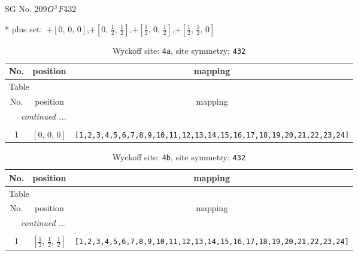 \documentclass[fleqn,8pt]{jsarticle}
\begin{document}
\setcounter{MaxMatrixCols}{32}

\renewcommand{\tablename}{Table~}
\renewcommand{\figurename}{Figure~}
\begin{center}
\LARGE
SG No. 209\quad$O_{\rm }^{3}$\quad$F432$\quad[ cubic ]
\end{center}
* plus set:\,\,\,$+\left[ 0,\, 0,\, 0 \right]$,\quad $+\left[ 0,\, \frac{1}{2},\, \frac{1}{2} \right]$,\quad $+\left[ \frac{1}{2},\, 0,\, \frac{1}{2} \right]$,\quad $+\left[ \frac{1}{2},\, \frac{1}{2},\, 0 \right]$
\renewcommand{\arraystretch}{1.2}
\begin{longtable}{ccc}
\caption{Wyckoff site: {\tt 4a}, site symmetry: {\tt 432}}
 \\
 \hline \hline
No. & position & mapping \\ \hline \endfirsthead

\multicolumn{2}{l}{\tablename\ \thetable{}} \\
 \hline \hline
No. & position & mapping \\ \hline \endhead

 \hline \hline
\multicolumn{2}{r}{\footnotesize\it continued ...} \\ \endfoot

 \hline \hline
\multicolumn{2}{r}{} \\ \endlastfoot

1 & $\left[ 0,\, 0,\, 0 \right]$ & {\tt [1,2,3,4,5,6,7,8,9,10,11,12,13,14,15,16,17,18,19,20,21,22,23,24]} \\
\end{longtable}
\renewcommand{\arraystretch}{1.2}
\begin{longtable}{ccc}
\caption{Wyckoff site: {\tt 4b}, site symmetry: {\tt 432}}
 \\
 \hline \hline
No. & position & mapping \\ \hline \endfirsthead

\multicolumn{2}{l}{\tablename\ \thetable{}} \\
 \hline \hline
No. & position & mapping \\ \hline \endhead

 \hline \hline
\multicolumn{2}{r}{\footnotesize\it continued ...} \\ \endfoot

 \hline \hline
\multicolumn{2}{r}{} \\ \endlastfoot

1 & $\left[ \frac{1}{2},\, \frac{1}{2},\, \frac{1}{2} \right]$ & {\tt [1,2,3,4,5,6,7,8,9,10,11,12,13,14,15,16,17,18,19,20,21,22,23,24]} \\
\end{longtable}
\end{document}
